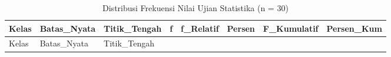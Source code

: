 \documentclass[
  indonesian,
  letterpaper,
]{book}
\begin{document}
\begin{longtable}[]{@{}
  >{\raggedright\arraybackslash}p{}
  >{\raggedright\arraybackslash}p{}
  >{\raggedleft\arraybackslash}p{}
  >{\raggedleft\arraybackslash}p{}
  >{\raggedleft\arraybackslash}p{}
  >{\raggedleft\arraybackslash}p{}
  >{\raggedleft\arraybackslash}p{}
  >{\raggedleft\arraybackslash}p{}@{}}
\caption{Distribusi Frekuensi Nilai Ujian Statistika (n =
30)}\tabularnewline
\toprule\noalign{}
\begin{minipage}[b]{\linewidth}\raggedright
Kelas
\end{minipage} & \begin{minipage}[b]{\linewidth}\raggedright
Batas\_Nyata
\end{minipage} & \begin{minipage}[b]{\linewidth}\raggedleft
Titik\_Tengah
\end{minipage} & \begin{minipage}[b]{\linewidth}\raggedleft
f
\end{minipage} & \begin{minipage}[b]{\linewidth}\raggedleft
f\_Relatif
\end{minipage} & \begin{minipage}[b]{\linewidth}\raggedleft
Persen
\end{minipage} & \begin{minipage}[b]{\linewidth}\raggedleft
F\_Kumulatif
\end{minipage} & \begin{minipage}[b]{\linewidth}\raggedleft
Persen\_Kum
\end{minipage} \\
\midrule\noalign{}
\endfirsthead
\toprule\noalign{}
\begin{minipage}[b]{\linewidth}\raggedright
Kelas
\end{minipage} & \begin{minipage}[b]{\linewidth}\raggedright
Batas\_Nyata
\end{minipage} & \begin{minipage}[b]{\linewidth}\raggedleft
Titik\_Tengah
\end{minipage} & \begin{minipage}[b]{\linewidth}\raggedleft

\end{minipage}
\end{longtable}
\end{document}
